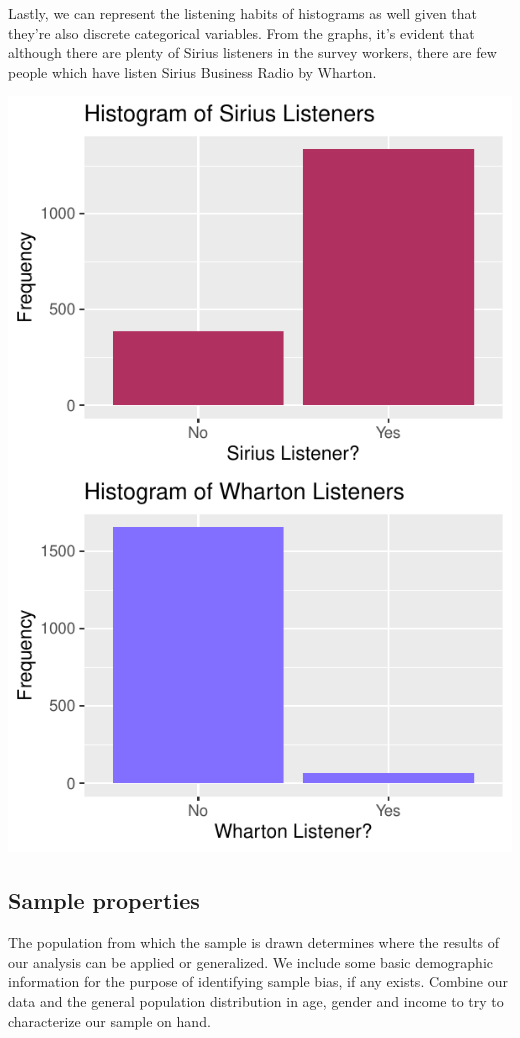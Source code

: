 \documentclass[
]{article}
\begin{document}
Lastly, we can represent the listening habits of histograms as well
given that they're also discrete categorical variables. From the graphs,
it's evident that although there are plenty of Sirius listeners in the
survey workers, there are few people which have listen Sirius Business
Radio by Wharton.

\includegraphics{hw1_sp2022_files/figure-latex/unnamed-chunk-13-1.pdf}

\hypertarget{sample-properties}{%
\subsection{Sample properties}\label{sample-properties}}

The population from which the sample is drawn determines where the
results of our analysis can be applied or generalized. We include some
basic demographic information for the purpose of identifying sample
bias, if any exists. Combine our data and the general population
distribution in age, gender and income to try to characterize our sample
on hand.
\end{document}
